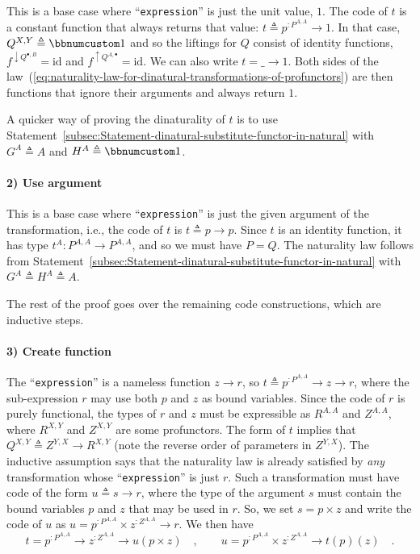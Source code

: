This is a base case where \textsf{``}\lstinline!expression!\textsf{''} is just the
unit value, $1$. The code of $t$ is a constant function that always
returns that value: $t\triangleq p^{:P^{A,A}}\rightarrow1$. In that
case, $Q^{X,Y}\triangleq\bbnum 1$ and so the liftings for $Q$ consist
of identity functions, $f^{\downarrow Q^{\bullet,B}}=\text{id}$ and
$f^{\uparrow Q^{A,\bullet}}=\text{id}$. We can also write $t=\_\rightarrow1$.
Both sides of the law~(\ref{eq:naturality-law-for-dinatural-transformations-of-profunctors})
are then functions that ignore their arguments and always return $1$.

A quicker way of proving the dinaturality of $t$ is to use Statement~\ref{subsec:Statement-dinatural-substitute-functor-in-natural}
with $G^{A}\triangleq A$ and $H^{A}\triangleq\bbnum 1$.

\paragraph{2) Use argument }

This is a base case where \textsf{``}\lstinline!expression!\textsf{''} is just the
given argument of the transformation, i.e., the code of $t$ is $t\triangleq p\rightarrow p$.
Since $t$ is an identity function, it has type $t^{A}:P^{A,A}\rightarrow P^{A,A}$,
and so we must have $P=Q$. The naturality law follows from Statement~\ref{subsec:Statement-dinatural-substitute-functor-in-natural}
with $G^{A}\triangleq H^{A}\triangleq A$.

The rest of the proof goes over the remaining code constructions,
which are inductive steps.

\paragraph{3) Create function}

The \textsf{``}\lstinline!expression!\textsf{''} is a nameless function $z\rightarrow r$,
so $t\triangleq p^{:P^{A,A}}\rightarrow z\rightarrow r$, where the
sub-expression $r$ may use both $p$ and $z$ as bound variables.
Since the code of $r$ is purely functional, the types of $r$ and
$z$ must be expressible as $R^{A,A}$ and $Z^{A,A}$, where $R^{X,Y}$
and $Z^{X,Y}$ are some profunctors. The form of $t$ implies that
$Q^{X,Y}\triangleq Z^{Y,X}\rightarrow R^{X,Y}$ (note the reverse
order of parameters in $Z^{Y,X}$). The inductive assumption says
that the naturality law is already satisfied by \emph{any} transformation
whose \textsf{``}\lstinline!expression!\textsf{''} is just $r$. Such a transformation
must have code of the form $u\triangleq s\rightarrow r$, where the
type of the argument $s$ must contain the bound variables $p$ and
$z$ that may be used in $r$. So, we set $s=p\times z$ and write
the code of $u$ as $u=p^{:P^{A,A}}\times z^{:Z^{A,A}}\rightarrow r$.
We then have
\begin{equation}
t=p^{:P^{A,A}}\rightarrow z^{:Z^{A,A}}\rightarrow u(p\times z)\quad,\quad\quad u=p^{:P^{A,A}}\times z^{:Z^{A,A}}\rightarrow t(p)(z)\quad.\label{eq:dinaturality-u-function-type-derivation0}
\end{equation}

